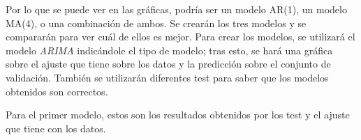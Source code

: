 Por lo que se puede ver en las gráficas, podría ser un modelo AR(1), un modelo MA(4), o una combinación de ambos. Se crearán los tres modelos y se compararán para ver cuál de ellos es mejor. Para crear los modelos, se utilizará el modelo \textit{ARIMA} indicándole el tipo de modelo; tras esto, se hará una gráfica sobre el ajuste que tiene sobre los datos y la predicción sobre el conjunto de validación. También se utilizarán diferentes test para saber que los modelos obtenidos son correctos.

Para el primer modelo, estos son los resultados obtenidos por los test y el ajuste que tiene con los datos.

\begin{figure}[H]
	\centering

\end{figure}
